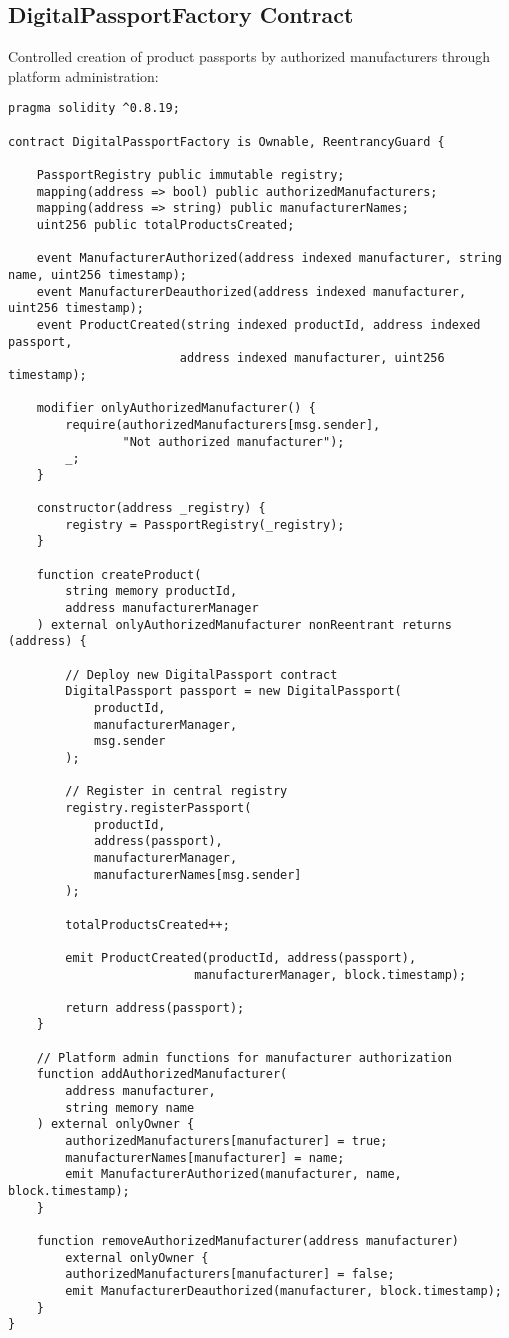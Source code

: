 \documentclass[11pt,a4paper]{article}
\begin{document}
\subsection{DigitalPassportFactory Contract}

Controlled creation of product passports by authorized manufacturers through platform administration:

\begin{verbatim}
pragma solidity ^0.8.19;

contract DigitalPassportFactory is Ownable, ReentrancyGuard {
    
    PassportRegistry public immutable registry;
    mapping(address => bool) public authorizedManufacturers;
    mapping(address => string) public manufacturerNames;
    uint256 public totalProductsCreated;
    
    event ManufacturerAuthorized(address indexed manufacturer, string name, uint256 timestamp);
    event ManufacturerDeauthorized(address indexed manufacturer, uint256 timestamp);
    event ProductCreated(string indexed productId, address indexed passport, 
                        address indexed manufacturer, uint256 timestamp);
    
    modifier onlyAuthorizedManufacturer() {
        require(authorizedManufacturers[msg.sender], 
                "Not authorized manufacturer");
        _;
    }
    
    constructor(address _registry) {
        registry = PassportRegistry(_registry);
    }
    
    function createProduct(
        string memory productId,
        address manufacturerManager
    ) external onlyAuthorizedManufacturer nonReentrant returns (address) {
        
        // Deploy new DigitalPassport contract
        DigitalPassport passport = new DigitalPassport(
            productId,
            manufacturerManager,
            msg.sender
        );
        
        // Register in central registry
        registry.registerPassport(
            productId,
            address(passport),
            manufacturerManager,
            manufacturerNames[msg.sender]
        );
        
        totalProductsCreated++;
        
        emit ProductCreated(productId, address(passport), 
                          manufacturerManager, block.timestamp);
        
        return address(passport);
    }
    
    // Platform admin functions for manufacturer authorization
    function addAuthorizedManufacturer(
        address manufacturer,
        string memory name
    ) external onlyOwner {
        authorizedManufacturers[manufacturer] = true;
        manufacturerNames[manufacturer] = name;
        emit ManufacturerAuthorized(manufacturer, name, block.timestamp);
    }
    
    function removeAuthorizedManufacturer(address manufacturer) 
        external onlyOwner {
        authorizedManufacturers[manufacturer] = false;
        emit ManufacturerDeauthorized(manufacturer, block.timestamp);
    }
}
\end{verbatim}
\end{document}
